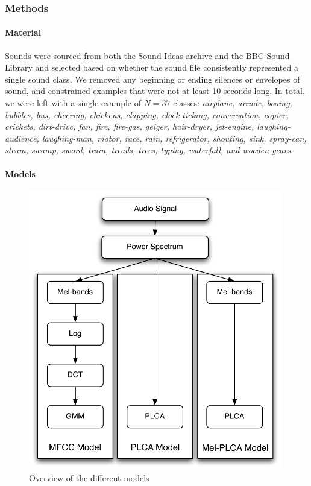 \documentclass[a4paper,10pt,final]{ThesisStyle}
\begin{document}
\subsubsection{Methods}

\paragraph{Material}
Sounds were sourced from both the Sound Ideas archive and the BBC Sound Library and selected based on whether the sound file consistently represented a single sound class.  We removed any beginning or ending silences or envelopes of sound, and constrained examples that were not at least 10 seconds long.  In total, we were left with a single example of $N = 37$ classes: \textit{airplane, arcade, booing, bubbles, bus, cheering, chickens, clapping, clock-ticking, conversation, copier, crickets, dirt-drive, fan, fire, fire-gas, geiger, hair-dryer, jet-engine, laughing-audience, laughing-man, motor, race, rain, refrigerator, shouting, sink, spray-can, steam, swamp, sword, train, treads, trees, typing, waterfall, and wooden-gears}.  

\paragraph{Models}

\begin{figure}
\centering
\includegraphics[width=0.99\textwidth]{images/models.pdf}
\caption{Overview of the different models}
\label{fig:models}
\end{figure}
\end{document}
